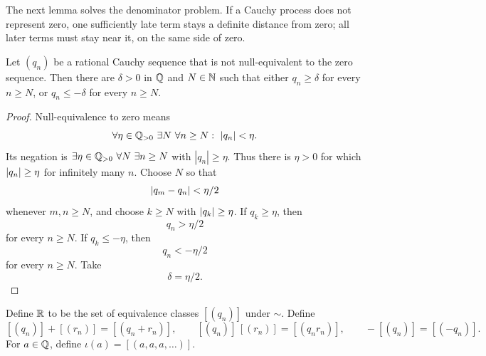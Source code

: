 The next lemma solves the denominator problem. If a Cauchy process does not
represent zero, one sufficiently late term stays a definite distance from
zero; all later terms must stay near it, on the same side of zero.
\begin{lemma}
\label{lem:eventual-separation}
Let $(q_n)$ be a rational Cauchy sequence that is not null-equivalent to the zero sequence. Then there are $\delta>0$ in $\mathbb{Q}$ and $N\in\mathbb{N}$ such that either $q_n\geq\delta$ for every $n\geq N$, or $q_n\leq-\delta$ for every $n\geq N$.
\end{lemma}
\begin{proof}
Null-equivalence to zero means
\[
\forall\eta\in\mathbb{Q}_{>0}\ \exists N\ \forall n\geq N:\ |q_n|<\eta.
\]
Its negation is $\exists\eta\in\mathbb{Q}_{>0}\ \forall N\ \exists n\geq N$
with $|q_n|\geq\eta$. Thus there is $\eta>0$ for which $\lvert q_n\rvert\geq\eta$ for infinitely many $n$. Choose $N$ so that
\[
\lvert q_m-q_n\rvert<\eta/2
\]
 whenever $m,n\geq N$, and choose $k\geq N$ with $\lvert q_k\rvert\geq\eta$. If $q_k\geq\eta$, then
\[
q_n>\eta/2
\]
 for every $n\geq N$. If $q_k\leq-\eta$, then
\[
q_n< -\eta/2
\]
 for every $n\geq N$. Take
\[
\delta=\eta/2.
\]

\end{proof}

\begin{construction}
\label{con:real-cauchy}
Define $\mathbb{R}$ to be the set of equivalence classes $[(q_n)]$ under $\sim$. Define
\[
[(q_n)]+[(r_n)]=[(q_n+r_n)],\qquad
[(q_n)]\,[(r_n)]=[(q_nr_n)],\qquad
-[(q_n)]=[(-q_n)].
\]
For $a\in\mathbb{Q}$, define $\iota(a)=[(a,a,a,\ldots)]$.
\end{construction}

